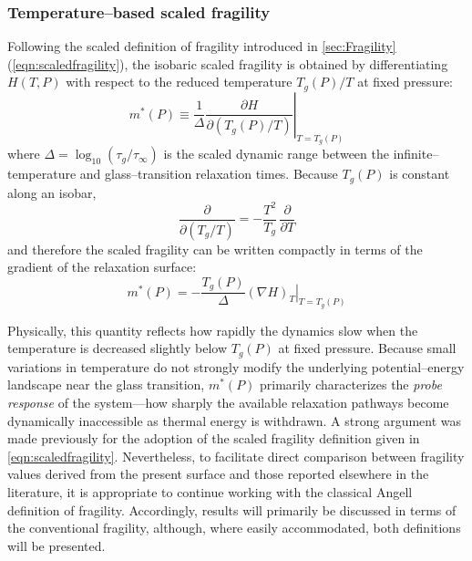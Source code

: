 \subsubsection*{Temperature–based scaled  fragility}
Following the scaled definition of fragility introduced in \sect\ref{sec:Fragility} (\eqn\ref{eqn:scaledfragility}), the isobaric scaled fragility is obtained by differentiating $H(T,P)$ with respect to the reduced temperature $T_{g}(P)/T$ at fixed pressure:
\begin{equation}
	m^{*}(P)
	\equiv
	\left.
	\frac{1}{\Delta}
	\frac{\partial H}{\partial\!\left( T_{g}(P)/T \right)}
	\right|_{T=T_{g}(P)}
\end{equation}
where $\Delta=\log_{10}(\tau_{g}/\tau_{\infty})$ is the scaled dynamic range between the
infinite–temperature and glass–transition relaxation times.  Because $T_{g}(P)$ is constant along an
isobar,
\[
\frac{\partial}{\partial (T_{g}/T)} = -\frac{T^{2}}{T_{g}}\,\frac{\partial}{\partial T}
\]
and therefore the scaled  fragility can be written compactly in terms of the gradient of the relaxation
surface:
\begin{equation}
	\label{eqn:mpstar_surface}
	m^{*}(P)
	=
	-\frac{T_{g}(P)}{\Delta}
	\left.
	\left( \nabla H \right)_T
	\right|_{T=T_{g}(P)}
\end{equation}

Physically, this quantity reflects how rapidly the dynamics slow when the temperature is decreased
slightly below $T_{g}(P)$ at fixed pressure.  Because small variations in temperature do not strongly
modify the underlying potential–energy landscape near the glass transition, $m^{*}(P)$ primarily
characterizes the \emph{probe response} of the system—how sharply the available relaxation pathways
become dynamically inaccessible as thermal energy is withdrawn. A strong argument was made previously for the adoption of the scaled fragility definition given in \eqn \ref{eqn:scaledfragility}. Nevertheless, to facilitate direct comparison between fragility values derived from the present surface and those reported elsewhere in the literature, it is appropriate to continue working with the classical Angell definition of fragility. Accordingly, results will primarily be discussed in terms of the conventional fragility, although, where easily accommodated, both definitions will be presented.

